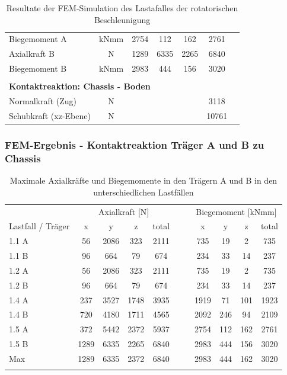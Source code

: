 \begin{table}[H]
\begin{tabular}{lcccccc}
  Biegemoment A	&	kNmm	&	2754	&	112	&	162	&	2761	&		\\
  Axialkraft B	&	N	&	1289	&	6335	&	2265	&	6840	&		\\
  Biegemoment B	&	kNmm	&	2983	&	444	&	156	&	3020	&		\\	\hline	\\
  \multicolumn{5}{l}{\textbf{Kontaktreaktion: Chassis - Boden}}									&		&		\\	\thickhline
  Normalkraft (Zug)	&	N	&		&		&		&	3118	&		\\
  Schubkraft (xz-Ebene)	&	N	&		&		&		&	10761	&		\\	\hline
  \end{tabular}
  \caption{Resultate der FEM-Simulation des Lastafalles der rotatorischen Beschleunigung}
  \label{tab:FEM 1.5}
  \end{table}


  \subsubsection{FEM-Ergebnis - Kontaktreaktion Träger A und B zu Chassis}
  \label{sec:FEMres Träger}
  \begin{table}[H]
  \centering
  \begin{tabular}{lcccccccccc}
  \thickhline
  	&	\multicolumn{4}{c}{Axialkraft [N]}							&	&	&	\multicolumn{4}{c}{Biegemoment [kNmm]}							\\
  Lastfall / Träger	&	x	&	y	&	z	&	total	&	&	&	x	&	y	&	z	&	total	\\	\hline
  1.1 A	&	56	&	2086	&	323	&	2111	&	&	&	735	&	19	&	2	&	735	\\
  1.1 B	&	96	&	664	&	79	&	674	&	&	&	234	&	33	&	14	&	237	\\
  1.2 A	&	56	&	2086	&	323	&	2111	&	&	&	735	&	19	&	2	&	735	\\
  1.2 B	&	96	&	664	&	79	&	674	&	&	&	234	&	33	&	14	&	237	\\
  1.4 A	&	237	&	3527	&	1748	&	3935	&	&	&	1919	&	71	&	101	&	1923	\\
  1.4 B	&	720	&	4180	&	1711	&	4565	&	&	&	2092	&	246	&	94	&	2109	\\
  1.5 A	&	372	&	5442	&	2372	&	5937	&	&	&	2754	&	112	&	162	&	2761	\\
  1.5 B	&	1289	&	6335	&	2265	&	6840	&	&	&	2983	&	444	&	156	&	3020	\\	\hline
  Max	&	1289	&	6335	&	2372	&	6840	&	&	&	2983	&	444	&	162	&	3020	\\	\thickhline
  \end{tabular}
  \caption{Maximale Axialkräfte und Biegemomente in den Trägern A und B in den unterschiedlichen Lastfällen}
  \label{tab:FEMres Träger Kont}
  \end{table}
  
